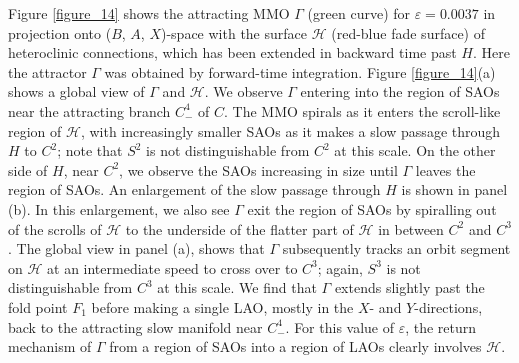 \documentclass{ws-ijbc}
\begin{document}
Figure \ref{figure_14} shows the attracting MMO $\Gamma$ (green curve) for $\varepsilon=0.0037$ in projection onto ($B$, $A$, $X$)-space with the surface $\mathscr{H}$ (red-blue fade surface) of heteroclinic connections, which has been extended in backward time past $H$.  Here the attractor $\Gamma$ was obtained by forward-time integration.  Figure \ref{figure_14}(a) shows a global view of $\Gamma$ and $\mathscr{H}$.  We observe $\Gamma$ entering into the region of SAOs near the attracting branch $C^4_-$ of $C$.  The MMO spirals as it enters the scroll-like region of $\mathscr{H}$, with increasingly smaller SAOs as it makes a slow passage through $H$ to $C^2$; note that $S^2$ is not distinguishable from $C^2$ at this scale.  On the other side of $H$, near $C^2$, we observe the SAOs increasing in size until $\Gamma$ leaves the region of SAOs.  An enlargement of the slow passage through $H$ is shown in panel (b).  In this enlargement, we also see $\Gamma$ exit the region of SAOs by spiralling out of the scrolls of $\mathscr{H}$ to the underside of the flatter part of $\mathscr{H}$ in between $C^2$ and $C^3$.  The global view in panel (a), shows that $\Gamma$ subsequently tracks an orbit segment on $\mathscr{H}$ at an intermediate speed to cross over to $C^3$; again, $S^3$ is not distinguishable from $C^3$ at this scale.  We find that $\Gamma$ extends slightly past the fold point $F_1$ before making a single LAO, mostly in the $X$- and $Y$-directions, back to the attracting slow manifold near $C^4_-$.  For this value of $\varepsilon$, the return mechanism of $\Gamma$ from a region of SAOs into a region of LAOs clearly involves $\mathscr{H}$.
\end{document}
